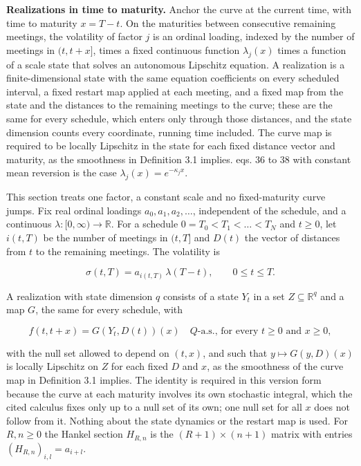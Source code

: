 \documentclass[11pt]{article}
\begin{document}
\textbf{Realizations in time to maturity.} Anchor the curve at the current time, with time to maturity \(x=T-t\). On the maturities between consecutive remaining meetings, the volatility of factor \(j\) is an ordinal loading, indexed by the number of meetings in \((t,t+x]\), times a fixed continuous function \(\lambda_j(x)\) times a function of a scale state that solves an autonomous Lipschitz equation. A realization is a finite-dimensional state with the same equation coefficients on every scheduled interval, a fixed restart map applied at each meeting, and a fixed map from the state and the distances to the remaining meetings to the curve; these are the same for every schedule, which enters only through those distances, and the state dimension counts every coordinate, running time included. The curve map is required to be locally Lipschitz in the state for each fixed distance vector and maturity, as the smoothness in \cite{bjork2001existence} Definition 3.1 implies. \cite{brace2024sofr} eqs. 36 to 38 with constant mean reversion is the case \(\lambda_j(x)=e^{-\kappa_jx}\).

This section treats one factor, a constant scale and no fixed-maturity curve jumps. Fix real ordinal loadings \(a_0,a_1,a_2,\dots\), independent of the schedule, and a continuous \(\lambda:[0,\infty)\to\mathbb R\). For a schedule \(0=T_0<T_1<\dots<T_N\) and \(t\ge0\), let \(i(t,T)\) be the number of meetings in \((t,T]\) and \(D(t)\) the vector of distances from \(t\) to the remaining meetings. The volatility is

\begin{equation*}
\sigma(t,T)=a_{i(t,T)}\,\lambda(T-t),\qquad 0\le t\le T. \tag{3.138}\label{eq:3.138}
\end{equation*}

A realization with state dimension \(q\) consists of a state \(Y_t\) in a set \(Z\subseteq\mathbb R^q\) and a map \(G\), the same for every schedule, with

\begin{equation*}
f(t,t+x)=G(Y_t,D(t))(x)\quad Q\text{-a.s., for every }t\ge0\text{ and }x\ge0, \tag{3.139}\label{eq:3.139}
\end{equation*}

with the null set allowed to depend on \((t,x)\), and such that \(y\mapsto G(y,D)(x)\) is locally Lipschitz on \(Z\) for each fixed \(D\) and \(x\), as the smoothness of the curve map in \cite{bjork2001existence} Definition 3.1 implies. The identity is required in this version form because the curve at each maturity involves its own stochastic integral, which the cited calculus fixes only up to a null set of its own; one null set for all \(x\) does not follow from it. Nothing about the state dynamics or the restart map is used. For \(R,n\ge0\) the Hankel section \(H_{R,n}\) is the \((R+1)\times(n+1)\) matrix with entries \((H_{R,n})_{i,l}=a_{i+l}\).
\end{document}
